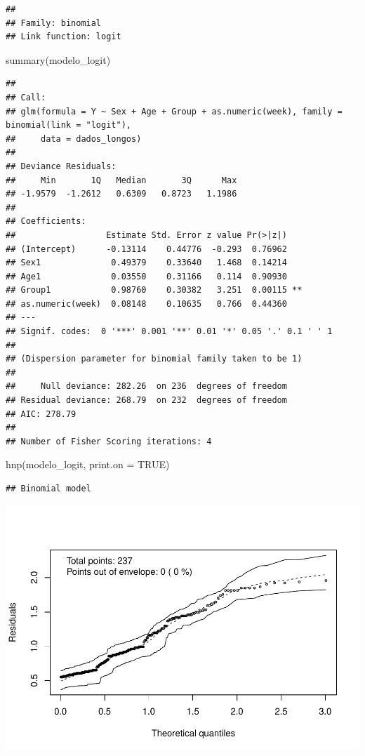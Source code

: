 \documentclass[
]{article}
\newenvironment{Shaded}{\begin{snugshade}}{\end{snugshade}}
\newcommand{\AttributeTok}[1]{\textcolor[rgb]{0.77,0.63,0.00}{#1}}
\newcommand{\ConstantTok}[1]{\textcolor[rgb]{0.00,0.00,0.00}{#1}}
\newcommand{\FunctionTok}[1]{\textcolor[rgb]{0.00,0.00,0.00}{#1}}
\newcommand{\NormalTok}[1]{#1}
\begin{document}
\begin{verbatim}
## 
## Family: binomial 
## Link function: logit
\end{verbatim}

\begin{Shaded}
\begin{Highlighting}[]
\FunctionTok{summary}\NormalTok{(modelo\_logit)}
\end{Highlighting}
\end{Shaded}

\begin{verbatim}
## 
## Call:
## glm(formula = Y ~ Sex + Age + Group + as.numeric(week), family = binomial(link = "logit"), 
##     data = dados_longos)
## 
## Deviance Residuals: 
##     Min       1Q   Median       3Q      Max  
## -1.9579  -1.2612   0.6309   0.8723   1.1986  
## 
## Coefficients:
##                  Estimate Std. Error z value Pr(>|z|)   
## (Intercept)      -0.13114    0.44776  -0.293  0.76962   
## Sex1              0.49379    0.33640   1.468  0.14214   
## Age1              0.03550    0.31166   0.114  0.90930   
## Group1            0.98760    0.30382   3.251  0.00115 **
## as.numeric(week)  0.08148    0.10635   0.766  0.44360   
## ---
## Signif. codes:  0 '***' 0.001 '**' 0.01 '*' 0.05 '.' 0.1 ' ' 1
## 
## (Dispersion parameter for binomial family taken to be 1)
## 
##     Null deviance: 282.26  on 236  degrees of freedom
## Residual deviance: 268.79  on 232  degrees of freedom
## AIC: 278.79
## 
## Number of Fisher Scoring iterations: 4
\end{verbatim}

\begin{Shaded}
\begin{Highlighting}[]
\FunctionTok{hnp}\NormalTok{(modelo\_logit, }\AttributeTok{print.on =} \ConstantTok{TRUE}\NormalTok{)}
\end{Highlighting}
\end{Shaded}

\begin{verbatim}
## Binomial model
\end{verbatim}

\includegraphics{EDA__files/figure-latex/unnamed-chunk-10-1.pdf}
\end{document}
